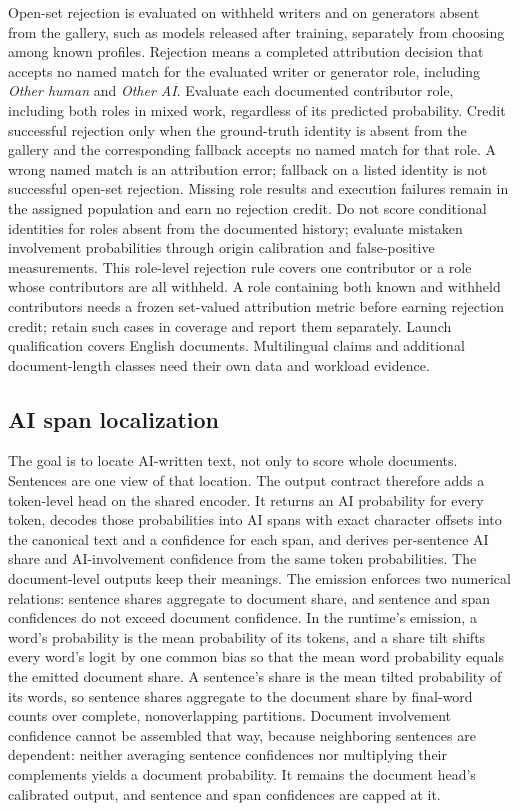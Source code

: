 Open-set rejection is evaluated on withheld writers and on generators absent
from the gallery, such as models released after training, separately from
choosing among known profiles. Rejection means a
completed attribution decision that accepts no named match for the evaluated
writer or generator role, including \emph{Other human} and \emph{Other AI}.
Evaluate each documented contributor role, including both roles in mixed work,
regardless of its predicted probability. Credit successful rejection only when
the ground-truth identity is absent from the gallery and the corresponding
fallback accepts no named match for that role. A wrong named match is an
attribution error; fallback on a listed identity is not successful open-set
rejection. Missing role results and execution failures remain in the assigned
population and earn no rejection credit. Do not score conditional identities
for roles absent from the documented history; evaluate mistaken involvement
probabilities through origin calibration and false-positive measurements.
This role-level rejection rule covers one contributor or a role whose
contributors are all withheld. A role containing both known and withheld
contributors needs a frozen set-valued attribution metric before earning
rejection credit; retain such cases in coverage and report them separately.
Launch qualification covers English documents. Multilingual claims and
additional document-length classes need their own data and workload evidence.

\subsection{AI span localization}\label{span-outputs}

The goal is to locate AI-written text, not only to score whole documents.
Sentences are one view of that location. The output contract therefore adds a
token-level head on the shared encoder. It returns an AI probability for every
token, decodes those probabilities into AI spans with exact character offsets
into the canonical text and a confidence for each span, and derives per-sentence
AI share and AI-involvement confidence from the same token probabilities. The
document-level outputs keep their meanings. The emission enforces two numerical
relations: sentence shares aggregate to document share, and sentence and span
confidences do not exceed document confidence. In the runtime's emission, a word's
probability is the mean probability of its tokens, and a share tilt shifts every
word's logit by one common bias so that the mean word probability equals the
emitted document share. A sentence's
share is the mean tilted probability of its words, so sentence shares aggregate
to the document share by final-word counts over complete, nonoverlapping
partitions. Document involvement confidence cannot be assembled that way,
because neighboring sentences are dependent: neither averaging sentence
confidences nor multiplying their complements yields a document probability.
It remains the document head's calibrated output, and sentence and span
confidences are capped at it.

